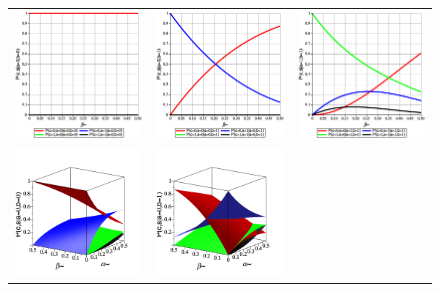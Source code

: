 \begin{figure}
    \begin{tabular}{ccc}
        \includegraphics[width=.3\textwidth]{media/noisy_half_adder_value_dist_00.eps} &
        \includegraphics[width=.3\textwidth]{media/noisy_half_adder_value_dist_01.eps} &
        \includegraphics[width=.3\textwidth]{media/noisy_half_adder_value_dist_11.eps} \\
        \includegraphics[width=.3\textwidth]{media/noisy_half_adder_value_full_dist_00.png} &
        \includegraphics[width=.3\textwidth]{media/noisy_half_adder_value_full_dist_01.png} &

\end{tabular}
\end{figure}
